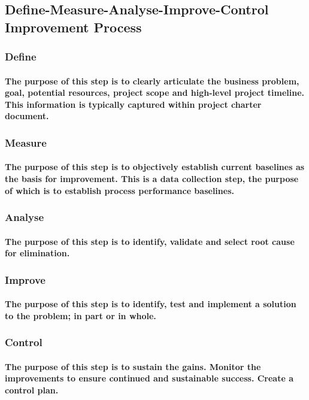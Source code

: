 \documentclass{acm_proc_article-sp}
\begin{document}
\subsection{Define-Measure-Analyse-Improve-Control Improvement Process}
\subsubsection{Define}
\paragraph{The purpose of this step is to clearly articulate the business problem, goal, potential resources, project scope and high-level project timeline. This information is typically captured within project charter document.}
\subsubsection{Measure}
\paragraph{The purpose of this step is to objectively establish current baselines as the basis for improvement. This is a data collection step, the purpose of which is to establish process performance baselines.}
\subsubsection{Analyse}
\paragraph{The purpose of this step is to identify, validate and select root cause for elimination.}
\subsubsection{Improve}
\paragraph{The purpose of this step is to identify, test and implement a solution to the problem; in part or in whole.}
\subsubsection{Control}
\paragraph{The purpose of this step is to sustain the gains. Monitor the improvements to ensure continued and sustainable success. Create a control plan.}
\end{document}
